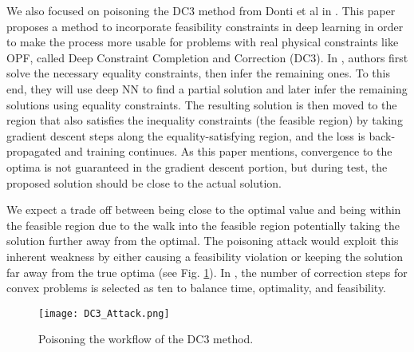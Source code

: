 We also focused on poisoning the DC3 method from Donti et al in \cite{donti2021dc3}. This paper proposes a method to incorporate
feasibility constraints in deep learning in order to make
the process more usable for problems with real physical constraints like OPF, called Deep Constraint Completion and Correction (DC3). In \cite{donti2021dc3}, authors first solve the necessary equality constraints, then infer the remaining ones. To this end, they will
use deep NN to find a partial solution and later infer the remaining solutions using equality constraints. The resulting solution is then moved to the region that also
satisfies the inequality constraints (the feasible region) by taking gradient descent steps along the equality-satisfying region,
and the loss is back-propagated and training continues. As this
paper mentions, convergence to the optima is not guaranteed
in the gradient descent portion, but during test, the proposed
solution should be close to the actual solution. 

We expect a trade off between being close to the optimal value and being within the feasible region due to the walk into the feasible region potentially taking the solution further away from the optimal. The poisoning attack would exploit this inherent weakness by either causing a feasibility violation or keeping the solution far away from the true optima (see Fig. \ref{dc3fig}). In \cite{donti2021dc3}, the number of correction steps for convex problems is selected as ten to balance time, optimality, and feasibility. 

\begin{figure}[ht]
\centerline{\texttt{[image: DC3\_Attack.png]}}
\vspace{-.2cm}
\caption{Poisoning the workflow of the DC3 method.}
\label{dc3fig}
\end{figure}
